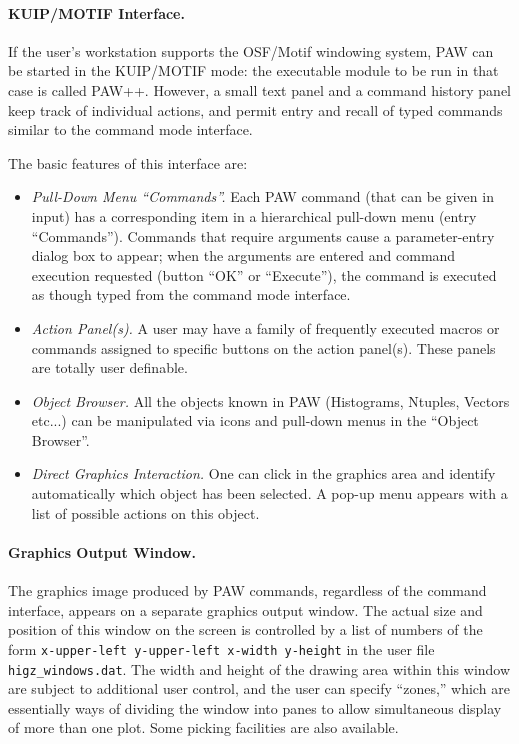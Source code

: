\paragraph{KUIP/MOTIF Interface.}  If the user's workstation supports the 
OSF/Motif windowing system, PAW can be started in the KUIP/MOTIF mode: the 
executable module to be run in that case is called PAW++.  However, a small 
text panel and a command history panel keep track of individual actions, and 
permit entry and recall of typed commands similar to the command mode interface.

The basic features of this interface are:
 
\begin{itemize}
\item {\it Pull-Down Menu ``Commands''.\/}  Each PAW command (that can be given
      in input) has a corresponding item in a hierarchical pull-down menu
      (entry ``Commands'').  Commands that require arguments cause a
      parameter-entry dialog box to appear;  when the arguments are entered and
      command execution requested (button ``OK'' or ``Execute''), the command
      is executed as though typed from the command mode interface.
\item {\it Action Panel(s).\/}  A user may have a family of frequently executed
      macros or commands assigned to specific buttons on the action panel(s).
      These panels are totally user definable.
\item {\it Object Browser.\/} All the objects known in PAW (Histograms, Ntuples,
      Vectors etc...) can be manipulated via icons and pull-down menus in the
      ``Object Browser''. 
\item {\it Direct Graphics Interaction.\/} One can click in the graphics area 
      and identify automatically which object has been selected. A pop-up menu 
      appears with a list of possible actions on this object.
\end{itemize}
 
\paragraph{Graphics Output Window.}  The graphics image produced by PAW
commands, regardless of the command interface, appears on a separate graphics 
output window. The actual size and position of this window on the screen is 
controlled by a list of numbers of the form {\tt x-upper-left y-upper-left 
x-width y-height} in the user file \texttt{higz_windows.dat}. The width and 
height of the drawing area within this window are subject to additional user 
control, and the user can specify ``zones,'' which are essentially ways of 
dividing the window into panes to allow simultaneous display of more than one 
plot. Some picking facilities are also available.
 
